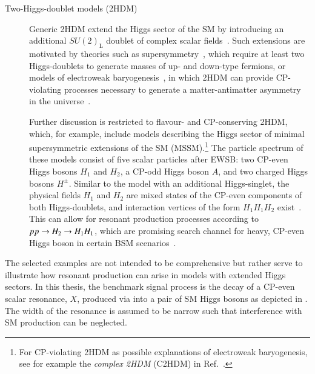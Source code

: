 \begin{description}
\item[Two-Higgs-doublet models (2HDM)] Generic 2HDM extend the Higgs sector of
  the SM by introducing an additional $SU(2)_{\text{L}}$ doublet of complex
  scalar fields~\cite{Gunion:1989we,Branco:2011iw}. Such extensions are
  motivated by theories such as supersymmetry~\cite{Haber:1984rc}, which require
  at least two Higgs-doublets to generate masses of up- and down-type fermions,
  or models of electroweak baryogenesis~\cite{Trodden:1998ym}, in which 2HDM can
  provide CP-violating processes necessary to generate a matter-antimatter
  asymmetry in the universe~\cite{Sakharov:1967dj}.

  Further discussion is restricted to flavour- and CP-conserving 2HDM, which,
  for example, include models describing the Higgs sector of minimal
  supersymmetric extensions of the SM (MSSM).\footnote{For CP-violating 2HDM as
    possible explanations of electroweak baryogenesis, see for example the
    \emph{complex 2HDM} (C2HDM) in Ref.~\cite{Fontes:2017zfn}.}
  The particle spectrum of these models consist of five scalar particles after
  EWSB: two CP-even Higgs bosons $H_1$ and $H_2$, a CP-odd Higgs boson $A$, and
  two charged Higgs bosons $H^\pm$. Similar to the model with an additional
  Higgs-singlet, the physical fields $H_1$ and $H_2$ are mixed states of the
  CP-even components of both Higgs-doublets, and interaction vertices of the
  form $H_1 H_1 H_2$ exist~\cite{Gunion:1989we,Branco:2011iw}. This can allow
  for resonant production processes according to $pp \to H_2 \to H_1 H_1$,
  which are promising search channel for heavy, CP-even Higgs boson in certain
  BSM scenarios~\cite{Dolan:2012ac,Djouadi:2013vqa,Djouadi:2013uqa}.

\end{description}
The selected examples are not intended to be comprehensive but rather serve to
illustrate how resonant \HH production can arise in models with extended Higgs
sectors. In this thesis, the benchmark signal process is the decay of a CP-even
scalar resonance, $X$, produced via \ggF into a pair of SM Higgs bosons as
depicted in . The width of the resonance is
assumed to be narrow such that interference with SM \HH production can be
neglected.

